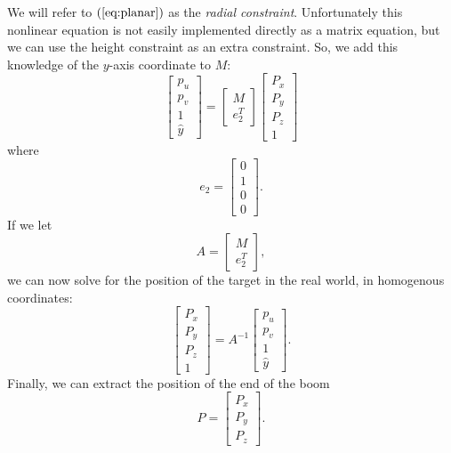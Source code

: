 \documentclass[letterpaper, 10 pt, conference]{ieeeconf}  %
\newcommand{\eq}[1]{$\left(\ref{eq:#1}\right)$}
\begin{document}
We will refer to \eq{planar} as the \emph{radial constraint}. Unfortunately this nonlinear equation is not easily implemented directly as a matrix equation, but we can use the height constraint as an extra constraint. So, we add this knowledge of the $y$-axis coordinate to $M$:
\begin{equation}
\left[\begin{array}{c}p_u \\p_v \\1 \\ \hat{y} \end{array}\right]
= \left[\begin{array}{c}M \\e_2^T\end{array}\right]
\left[\begin{array}{c}P_x \\P_y \\P_z \\1\end{array}\right]
\end{equation}
where 
\[
e_2 = \left[\begin{array}{c}0 \\1 \\0 \\0\end{array}\right].
\]
If we let
\[
A = \left[\begin{array}{c}M \\e_2^T\end{array}\right], 
\]
we can now solve for the position of the target in the real world, in homogenous coordinates:
\[
\left[\begin{array}{c}P_x \\P_y \\P_z \\1\end{array}\right]=A^{-1}
\left[\begin{array}{c}p_u \\p_v \\1\\ \hat{y}\end{array}\right].
\]
Finally, we can extract the position of the end of the boom 
\[
P = \left[\begin{array}{c}P_x \\ P_y \\ P_z\end{array}\right].
\]
\end{document}
